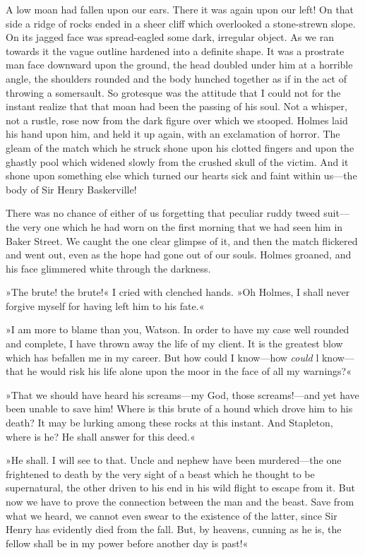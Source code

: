 A low moan had fallen upon our ears. There it was again upon our left! On that side a ridge of rocks ended in a sheer cliff which overlooked a stone-strewn slope. On its jagged face was spread-eagled some dark, irregular object. As we ran towards it the vague outline hardened into a definite shape. It was a prostrate man face downward upon the ground, the head doubled under him at a horrible angle, the shoulders rounded and the body hunched together as if in the act of throwing a somersault. So grotesque was the attitude that I could not for the instant realize that that moan had been the passing of his soul. Not a whisper, not a rustle, rose now from the dark figure over which we stooped. Holmes laid his hand upon him, and held it up again, with an exclamation of horror. The gleam of the match which he struck shone upon his clotted fingers and upon the ghastly pool which widened slowly from the crushed skull of the victim. And it shone upon something else which turned our hearts sick and faint within us\allowbreak---\allowbreak the body of Sir Henry Baskerville!

There was no chance of either of us forgetting that peculiar ruddy tweed suit\allowbreak---\allowbreak the very one which he had worn on the first morning that we had seen him in Baker Street. We caught the one clear glimpse of it, and then the match flickered and went out, even as the hope had gone out of our souls. Holmes groaned, and his face glimmered white through the darkness.

»The brute! the brute!« I cried with clenched hands. »Oh Holmes, I shall never forgive myself for having left him to his fate.«

»I am more to blame than you, Watson. In order to have my case well rounded and complete, I have thrown away the life of my client. It is the greatest blow which has befallen me in my career. But how could I know\allowbreak---\allowbreak how \emph{could} l know\allowbreak---\allowbreak that he would risk his life alone upon the moor in the face of all my warnings?«

»That we should have heard his screams\allowbreak---\allowbreak my God, those \newline screams!\allowbreak---\allowbreak and yet have been unable to save him! Where is this brute of a hound which drove him to his death? It may be lurking among these rocks at this instant. And Stapleton, where is he? He shall answer for this deed.«

»He shall. I will see to that. Uncle and nephew have been murdered\allowbreak---\allowbreak the one frightened to death by the very sight of a beast which he thought to be supernatural, the other driven to his end in his wild flight to escape from it. But now we have to prove the connection between the man and the beast. Save from what we heard, we cannot even swear to the existence of the latter, since Sir Henry has evidently died from the fall. But, by heavens, cunning as he is, the fellow shall be in my power before another day is past!«

